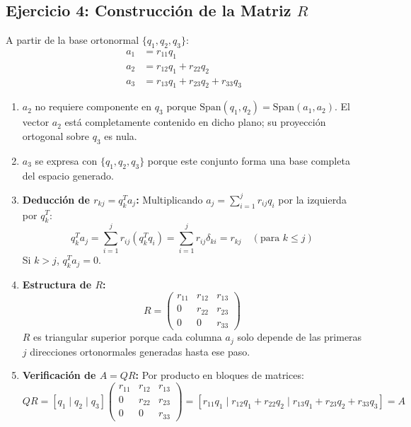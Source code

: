 \documentclass[11pt,a4paper]{article}
\theoremstyle{definition}
\theoremstyle{remark}
\begin{document}
\subsection{Ejercicio 4: Construcción de la Matriz $R$}
A partir de la base ortonormal $\{q_1, q_2, q_3\}$:
\begin{align*}
    a_1 &= r_{11} q_1 \\
    a_2 &= r_{12} q_1 + r_{22} q_2 \\
    a_3 &= r_{13} q_1 + r_{23} q_2 + r_{33} q_3
\end{align*}

\begin{enumerate}[leftmargin=*]
    \item $a_2$ no requiere componente en $q_3$ porque $\text{Span}(q_1, q_2) = \text{Span}(a_1, a_2)$. El vector $a_2$ está completamente contenido en dicho plano; su proyección ortogonal sobre $q_3$ es nula.
    \item $a_3$ se expresa con $\{q_1, q_2, q_3\}$ porque este conjunto forma una base completa del espacio generado.
    \item \textbf{Deducción de $r_{kj} = q_k^T a_j$:}
    Multiplicando $a_j = \sum_{i=1}^j r_{ij} q_i$ por la izquierda por $q_k^T$:
    \begin{equation}
        q_k^T a_j = \sum_{i=1}^j r_{ij} (q_k^T q_i) = \sum_{i=1}^j r_{ij} \delta_{ki} = r_{kj} \quad (\text{para } k \le j)
    \end{equation}
    Si $k > j$, $q_k^T a_j = 0$.
    \item \textbf{Estructura de $R$:}
    \begin{equation}
        R = \begin{pmatrix}
            r_{11} & r_{12} & r_{13} \\
            0 & r_{22} & r_{23} \\
            0 & 0 & r_{33}
        \end{pmatrix}
    \end{equation}
    $R$ es triangular superior porque cada columna $a_j$ solo depende de las primeras $j$ direcciones ortonormales generadas hasta ese paso.
    \item \textbf{Verificación de $A = QR$:}
    Por producto en bloques de matrices:
    \begin{equation}
        Q R = [q_1 \mid q_2 \mid q_3] \begin{pmatrix}
            r_{11} & r_{12} & r_{13} \\
            0 & r_{22} & r_{23} \\
            0 & 0 & r_{33}
        \end{pmatrix} = [r_{11}q_1 \mid r_{12}q_1 + r_{22}q_2 \mid r_{13}q_1 + r_{23}q_2 + r_{33}q_3] = A
    \end{equation}
\end{enumerate}
\end{document}
